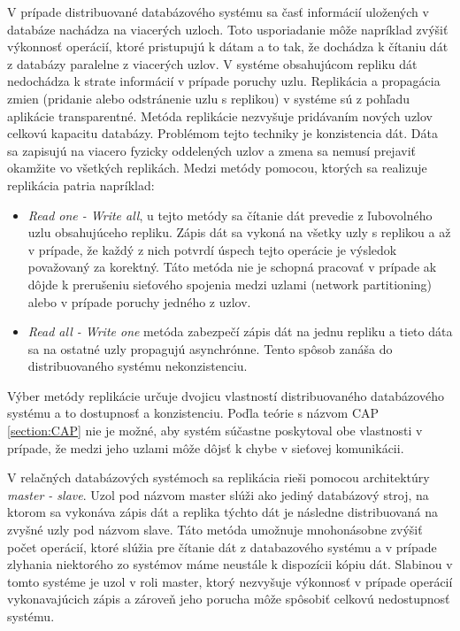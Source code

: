 \documentclass[11pt,twoside,a4paper]{book}
\begin{document}
V prípade distribuované databázového systému sa časť informácií uložených v databáze nachádza na viacerých uzloch. Toto usporiadanie môže napríklad zvýšiť výkonnosť operácií, ktoré pristupujú k dátam a to tak, že dochádza k čítaniu dát z databázy paralelne z viacerých uzlov. V systéme obsahujúcom repliku dát nedochádza k strate informácií v prípade poruchy uzlu. Replikácia a propagácia zmien (pridanie alebo odstránenie uzlu s replikou) v systéme sú z pohľadu aplikácie transparentné. Metóda replikácie nezvyšuje pridávaním nových uzlov celkovú kapacitu databázy. Problémom tejto techniky je konzistencia dát. Dáta sa zapisujú na viacero fyzicky oddelených uzlov a zmena sa nemusí prejaviť okamžite vo všetkých replikách. Medzi metódy pomocou, ktorých sa realizuje replikácia patria napríklad:
\begin{itemize}
  \item
      \emph{Read one - Write all}, u tejto metódy sa čítanie dát prevedie z ľubovolného uzlu obsahujúceho repliku. Zápis dát sa vykoná na všetky uzly s replikou a až v prípade, že každý z nich potvrdí úspech tejto operácie je výsledok považovaný za korektný. Táto metóda nie je schopná pracovať v prípade ak dôjde k prerušeniu sieťového spojenia medzi uzlami (network partitioning) alebo v prípade poruchy jedného z uzlov.
  \item
      \emph{Read all - Write one} metóda zabezpečí zápis dát na jednu repliku a tieto dáta sa na ostatné uzly propagujú asynchrónne. Tento spôsob zanáša do distribuovaného systému nekonzistenciu.
\end{itemize}


Výber metódy replikácie určuje dvojicu vlastností distribuovaného databázového systému a to dostupnosť a konzistenciu. Poďla teórie s názvom CAP \ref{section:CAP} nie je možné, aby systém súčastne poskytoval obe vlastnosti v prípade, že medzi jeho uzlami môže dôjsť k chybe v sieťovej komunikácii.

V relačných databázových systémoch sa replikácia rieši pomocou architektúry \emph{master - slave}. Uzol pod názvom master slúži ako jediný databázový stroj, na ktorom sa vykonáva zápis dát a replika týchto dát je následne distribuovaná na zvyšné uzly pod názvom slave. Táto metóda umožnuje mnohonásobne zvýšiť počet operácií, ktoré slúžia pre čítanie dát z databazového systému a v prípade zlyhania niektorého zo systémov máme neustále k dispozícii kópiu dát. Slabinou v tomto systéme je uzol v roli master, ktorý nezvyšuje výkonnosť v prípade operácií vykonavajúcich zápis a zároveň jeho porucha môže spôsobiť celkovú nedostupnosť systému.
\end{document}
